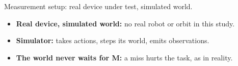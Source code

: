 \documentclass[11pt,aspectratio=43]{beamer}
\begin{document}
\begin{frame}{Measurement setup: real device under test, simulated world.}
\begin{center}
{}
\end{center}

\vspace{0.3cm}
\small
\begin{itemize}
  \setlength{\itemsep}{0.4em}
  \item \textbf{Real device, simulated world:} no real robot or orbit in this study.
  \item \textbf{Simulator:} takes actions, steps its world, emits observations.
  \item \textbf{The world never waits for M:} a miss hurts the task, as in reality.
\end{itemize}

\end{frame}
\end{document}
